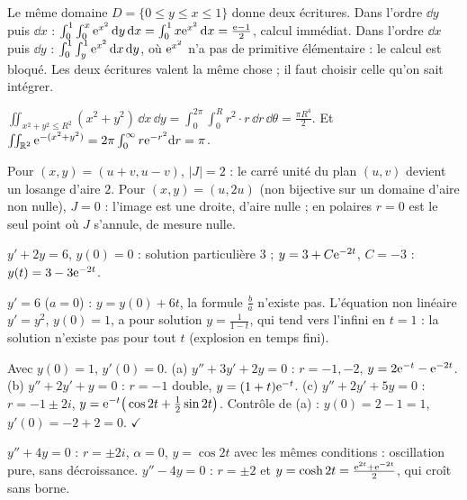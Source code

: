 \begin{cas}
Le même domaine $D=\{0\le y\le x\le1\}$ donne deux écritures. Dans l'ordre $\dd y$ puis $\dd x$ : $\int_0^1\int_0^x\mathrm{e}^{x^2}\,\mathrm{d} y\,\mathrm{d} x=\int_0^1x\mathrm{e}^{x^2}\,\mathrm{d} x=\frac{\mathrm{e}-1}2$, calcul immédiat. Dans l'ordre $\dd x$ puis $\dd y$ : $\int_0^1\int_y^1\mathrm{e}^{x^2}\,\mathrm{d} x\,\mathrm{d} y$, où $\mathrm{e}^{x^2}$ n'a pas de primitive élémentaire : le calcul est bloqué. Les deux écritures valent la même chose ; il faut choisir celle qu'on sait intégrer.
\end{cas}
\begin{exemple}
$\iint_{x^2+y^2\le R^2}(x^2+y^2)\,\dd x\,\dd y=\int_0^{2\pi}\int_0^Rr^2\cdot r\,\dd r\,\dd\theta=\frac{\pi R^4}2$. Et $\iint_{\mathbb{R}^2}\mathrm{e}^{-(x^2+y^2)}=2\pi\int_0^\infty r\mathrm{e}^{-r^2}\mathrm{d} r=\pi$.
\end{exemple}
\begin{cas}
Pour $(x,y)=(u+v,u-v)$, $|J|=2$ : le carré unité du plan $(u,v)$ devient un losange d'aire $2$. Pour $(x,y)=(u,2u)$ (non bijective sur un domaine d'aire non nulle), $J=0$ : l'image est une droite, d'aire nulle ; en polaires $r=0$ est le seul point où $J$ s'annule, de mesure nulle.
\end{cas}
\begin{exemple}[ordre 1]
$y'+2y=6$, $y(0)=0$ : solution particulière $3$ ; $y=3+C\mathrm{e}^{-2t}$, $C=-3$ : $y(t)=3-3\mathrm{e}^{-2t}$.
\end{exemple}
\begin{cas}[$a=0$ et blow-up]
$y'=6$ ($a=0$) : $y=y(0)+6t$, la formule $\frac ba$ n'existe pas. L'équation non linéaire $y'=y^2$, $y(0)=1$, a pour solution $y=\frac1{1-t}$, qui tend vers l'infini en $t=1$ : la solution n'existe pas pour tout $t$ (explosion en temps fini).
\end{cas}
\begin{exemple}
Avec $y(0)=1$, $y'(0)=0$. (a) $y''+3y'+2y=0$ : $r=-1,-2$, $y=2\mathrm{e}^{-t}-\mathrm{e}^{-2t}$. (b) $y''+2y'+y=0$ : $r=-1$ double, $y=(1+t)\mathrm{e}^{-t}$. (c) $y''+2y'+5y=0$ : $r=-1\pm2i$, $y=\mathrm{e}^{-t}\big(\cos2t+\frac12\sin2t\big)$. Contrôle de (a) : $y(0)=2-1=1$, $y'(0)=-2+2=0$. $\checkmark$
\end{exemple}
\begin{cas}
$y''+4y=0$ : $r=\pm2i$, $\alpha=0$, $y=\cos2t$ avec les mêmes conditions : oscillation pure, sans décroissance. $y''-4y=0$ : $r=\pm2$ et $y=\cosh2t=\frac{\mathrm{e}^{2t}+\mathrm{e}^{-2t}}2$, qui croît sans borne.
\end{cas}

